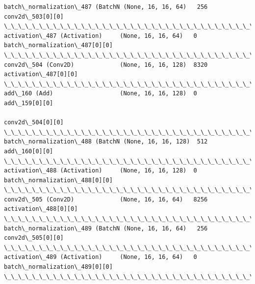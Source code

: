 \documentclass[11pt]{article}
\begin{document}
\begin{Verbatim}[commandchars=\\\{\}]
batch\_normalization\_487 (BatchN (None, 16, 16, 64)   256         conv2d\_503[0][0]                 
\_\_\_\_\_\_\_\_\_\_\_\_\_\_\_\_\_\_\_\_\_\_\_\_\_\_\_\_\_\_\_\_\_\_\_\_\_\_\_\_\_\_\_\_\_\_\_\_\_\_\_\_\_\_\_\_\_\_\_\_\_\_\_\_\_\_\_\_\_\_\_\_\_\_\_\_\_\_\_\_\_\_\_\_\_\_\_\_\_\_\_\_\_\_\_\_\_\_
activation\_487 (Activation)     (None, 16, 16, 64)   0           batch\_normalization\_487[0][0]    
\_\_\_\_\_\_\_\_\_\_\_\_\_\_\_\_\_\_\_\_\_\_\_\_\_\_\_\_\_\_\_\_\_\_\_\_\_\_\_\_\_\_\_\_\_\_\_\_\_\_\_\_\_\_\_\_\_\_\_\_\_\_\_\_\_\_\_\_\_\_\_\_\_\_\_\_\_\_\_\_\_\_\_\_\_\_\_\_\_\_\_\_\_\_\_\_\_\_
conv2d\_504 (Conv2D)             (None, 16, 16, 128)  8320        activation\_487[0][0]             
\_\_\_\_\_\_\_\_\_\_\_\_\_\_\_\_\_\_\_\_\_\_\_\_\_\_\_\_\_\_\_\_\_\_\_\_\_\_\_\_\_\_\_\_\_\_\_\_\_\_\_\_\_\_\_\_\_\_\_\_\_\_\_\_\_\_\_\_\_\_\_\_\_\_\_\_\_\_\_\_\_\_\_\_\_\_\_\_\_\_\_\_\_\_\_\_\_\_
add\_160 (Add)                   (None, 16, 16, 128)  0           add\_159[0][0]                    
                                                                 conv2d\_504[0][0]                 
\_\_\_\_\_\_\_\_\_\_\_\_\_\_\_\_\_\_\_\_\_\_\_\_\_\_\_\_\_\_\_\_\_\_\_\_\_\_\_\_\_\_\_\_\_\_\_\_\_\_\_\_\_\_\_\_\_\_\_\_\_\_\_\_\_\_\_\_\_\_\_\_\_\_\_\_\_\_\_\_\_\_\_\_\_\_\_\_\_\_\_\_\_\_\_\_\_\_
batch\_normalization\_488 (BatchN (None, 16, 16, 128)  512         add\_160[0][0]                    
\_\_\_\_\_\_\_\_\_\_\_\_\_\_\_\_\_\_\_\_\_\_\_\_\_\_\_\_\_\_\_\_\_\_\_\_\_\_\_\_\_\_\_\_\_\_\_\_\_\_\_\_\_\_\_\_\_\_\_\_\_\_\_\_\_\_\_\_\_\_\_\_\_\_\_\_\_\_\_\_\_\_\_\_\_\_\_\_\_\_\_\_\_\_\_\_\_\_
activation\_488 (Activation)     (None, 16, 16, 128)  0           batch\_normalization\_488[0][0]    
\_\_\_\_\_\_\_\_\_\_\_\_\_\_\_\_\_\_\_\_\_\_\_\_\_\_\_\_\_\_\_\_\_\_\_\_\_\_\_\_\_\_\_\_\_\_\_\_\_\_\_\_\_\_\_\_\_\_\_\_\_\_\_\_\_\_\_\_\_\_\_\_\_\_\_\_\_\_\_\_\_\_\_\_\_\_\_\_\_\_\_\_\_\_\_\_\_\_
conv2d\_505 (Conv2D)             (None, 16, 16, 64)   8256        activation\_488[0][0]             
\_\_\_\_\_\_\_\_\_\_\_\_\_\_\_\_\_\_\_\_\_\_\_\_\_\_\_\_\_\_\_\_\_\_\_\_\_\_\_\_\_\_\_\_\_\_\_\_\_\_\_\_\_\_\_\_\_\_\_\_\_\_\_\_\_\_\_\_\_\_\_\_\_\_\_\_\_\_\_\_\_\_\_\_\_\_\_\_\_\_\_\_\_\_\_\_\_\_
batch\_normalization\_489 (BatchN (None, 16, 16, 64)   256         conv2d\_505[0][0]                 
\_\_\_\_\_\_\_\_\_\_\_\_\_\_\_\_\_\_\_\_\_\_\_\_\_\_\_\_\_\_\_\_\_\_\_\_\_\_\_\_\_\_\_\_\_\_\_\_\_\_\_\_\_\_\_\_\_\_\_\_\_\_\_\_\_\_\_\_\_\_\_\_\_\_\_\_\_\_\_\_\_\_\_\_\_\_\_\_\_\_\_\_\_\_\_\_\_\_
activation\_489 (Activation)     (None, 16, 16, 64)   0           batch\_normalization\_489[0][0]    
\_\_\_\_\_\_\_\_\_\_\_\_\_\_\_\_\_\_\_\_\_\_\_\_\_\_\_\_\_\_\_\_\_\_\_\_\_\_\_\_\_\_\_\_\_\_\_\_\_\_\_\_\_\_\_\_\_\_\_\_\_\_\_\_\_\_\_\_\_\_\_\_\_\_\_\_\_\_\_\_\_\_\_\_\_\_\_\_\_\_\_\_\_\_\_\_\_\_

\end{Verbatim}
\end{document}
